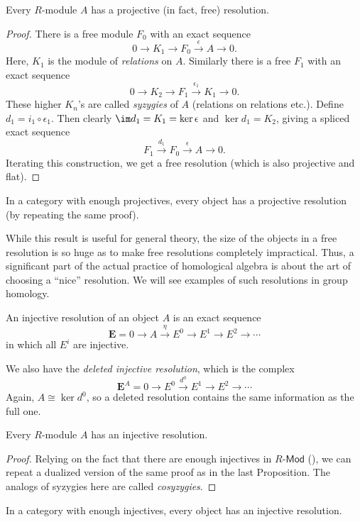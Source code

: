 \begin{prop}
    Every $R$-module $A$ has a projective (in fact, free) resolution. 
\end{prop}
\begin{proof}
     There is a free module $F_0$ with an exact sequence
     \[0\to K_1\to F_0\overset\epsilon\to A\to 0.\]
     Here, $K_1$ is the module of \emph{relations} on $A$. Similarly there is a free $F_1$ with an exact sequence
     \[0\to K_2\to F_1\overset{\epsilon_1}\to K_1\to 0.\]
     These higher $K_n$'s are called \emph{syzygies} of $A$ (relations on relations etc.).
     Define $d_1=i_1\circ\epsilon_1$. Then clearly $\im d_1=K_1=\ker\epsilon$ and $\ker d_1=K_2$, giving a spliced exact sequence
     \[F_1\overset{d_1}\to F_0\overset\epsilon\to A\to 0.\]
     Iterating this construction, we get a free resolution (which is also projective and flat).
\end{proof}
\begin{cor}
    In a category with enough projectives, every object has a projective resolution (by repeating the same proof).
\end{cor}

\begin{rem}
    While this result is useful for general theory, the size of the objects in a free resolution is so huge as to make free resolutions completely impractical. Thus, a significant part of the actual practice of homological algebra is about the art of choosing a ``nice'' resolution. We will see examples of such resolutions in group homology.
\end{rem}

\begin{defn}
    An injective resolution of an object $A$ is an exact sequence
    \[\bm{E}=0\to A\overset\eta\to E^0\to E^1\to E^2\to \cdots\]
    in which all $E^i$ are injective.
    
    We also have the \emph{deleted injective resolution}, which is the complex
    \[\bm{E}^A=0\to E^0\overset{d^0}\to E^1\to E^2\to \cdots\]
    Again, $A\cong\ker d^0$, so a deleted resolution contains the same information as the full one.
\end{defn}

\begin{prop}
    Every $R$-module $A$ has an injective resolution.
\end{prop}
\begin{proof}
     Relying on the fact that there are enough injectives in $R\text{-}\mathsf{Mod}$ (\cite[Thm. 3.38]{Rotman}), we can repeat a dualized version of the same proof as in the last Proposition. The analogs of syzygies here are called \emph{cosyzygies}.
\end{proof}
\begin{cor}
    In a category with enough injectives, every object has an injective resolution.
\end{cor}

